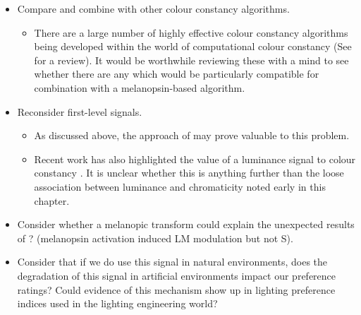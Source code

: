 \begin{itemize}
\begin{itemize}
\end{itemize}
\item Compare and combine with other colour constancy algorithms.
\begin{itemize}
    \item There are a large number of highly effective colour constancy algorithms being developed within the world of computational colour constancy (See \citet{gijsenij_computational_2011} for a review). It would be worthwhile reviewing these with a mind to see whether there are any which would be particularly compatible for combination with a melanopsin-based algorithm.
\end{itemize}
\item Reconsider first-level signals.
\begin{itemize}
    \item As discussed above, the approach of \citet{maloney_color_1986} may prove valuable to this problem.
    \item Recent work has also highlighted the value of a luminance signal to colour constancy \citep{chakrabarti_color_2015}. It is unclear whether this is anything further than the loose association between luminance and chromaticity noted early in this chapter.
\end{itemize}
\item Consider whether a melanopic transform could explain the unexpected results of \citet{cao_evidence_2018}? (melanopsin activation induced LM modulation but not S).
\item Consider that if we do use this signal in natural environments, does the degradation of this signal in artificial environments impact our preference ratings? Could evidence of this mechanism show up in lighting preference indices used in the lighting engineering world?
\end{itemize}






